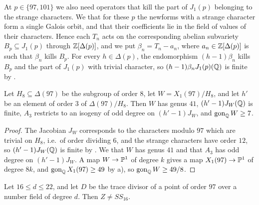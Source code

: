 At $p\in\{97,101\}$ we also need operators that kill the part of $J_1(p)$ belonging to the strange characters. We  that for these $p$ the newforms with a strange character form a single Galois orbit, and that their coefficients lie in the field of values of their characters. Hence each $T_n$ acts on the corresponding abelian subvariety $B_p\subseteq J_1(p)$ through $\mathbb{Z}[\Delta(p)]$, and we put $\beta_n=T_n-a_n$, where $a_n\in\mathbb{Z}[\Delta(p)]$ is such that $\beta_n$ kills $B_p$. For every $h\in\Delta(p)$, the endomorphism $(h-1)\beta_n$ kills $B_p$ and the part of $J_1(p)$ with trivial character, so $(h-1)\beta_nJ_1(p)(\mathbb{Q})$ is finite by .

\begin{lemma}\label{lem:W97}
Let $H_8\subseteq\Delta(97)$ be the subgroup of order $8$, let $W=X_1(97)/H_8$, and let $h'$ be an element of order $3$ of $\Delta(97)/H_8$. Then $W$ has genus $41$, $(h'-1)J_W(\mathbb{Q})$ is finite, $A_3$ restricts to an isogeny of odd degree on $(h'-1)J_W$, and $\operatorname{gon}_{\mathbb{Q}} W\geq7$.
\end{lemma}

\begin{proof}
The Jacobian $J_W$ corresponds to the characters modulo $97$ which are trivial on $H_8$, i.e.\ of order dividing $6$, and the strange characters have order $12$, so $(h'-1)J_W(\mathbb{Q})$ is finite by . We  that $W$ has genus $41$ and that $A_3$ has odd degree on $(h'-1)J_W$. A map $W\to\mathbb{P}^1$ of degree $k$ gives a map $X_1(97)\to\mathbb{P}^1$ of degree $8k$, and $\operatorname{gon}_{\mathbb{Q}} X_1(97)\geq 49$ by  a), so $\operatorname{gon}_{\mathbb{Q}} W\geq 49/8$.
\end{proof}

\begin{proposition}\label{prop:97}
Let $16\leq d\leq 22$, and let $D$ be the trace divisor of a point of order $97$ over a number field of degree $d$. Then $Z\neq SS_{16}$.
\end{proposition}


